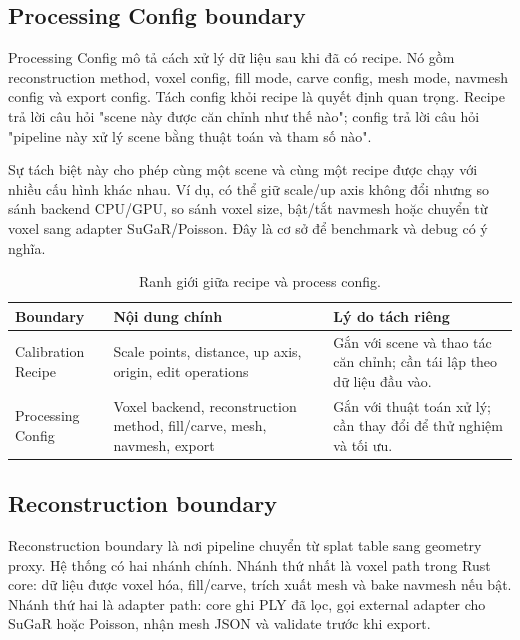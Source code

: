 \subsection{Processing Config boundary}

Processing Config mô tả cách xử lý dữ liệu sau khi đã có recipe. Nó gồm reconstruction method, voxel config, fill mode, carve config, mesh mode, navmesh config và export config. Tách config khỏi recipe là quyết định quan trọng. Recipe trả lời câu hỏi "scene này được căn chỉnh như thế nào"; config trả lời câu hỏi "pipeline này xử lý scene bằng thuật toán và tham số nào".

Sự tách biệt này cho phép cùng một scene và cùng một recipe được chạy với nhiều cấu hình khác nhau. Ví dụ, có thể giữ scale/up axis không đổi nhưng so sánh backend CPU/GPU, so sánh voxel size, bật/tắt navmesh hoặc chuyển từ voxel sang adapter SuGaR/Poisson. Đây là cơ sở để benchmark và debug có ý nghĩa.

\begin{table}[H]
\centering
\caption{Ranh giới giữa recipe và process config.}
\begin{tabularx}{\textwidth}{p{3.4cm}p{5.2cm}X}
\toprule
\textbf{Boundary} & \textbf{Nội dung chính} & \textbf{Lý do tách riêng}\\
\midrule
Calibration Recipe & Scale points, distance, up axis, origin, edit operations & Gắn với scene và thao tác căn chỉnh; cần tái lập theo dữ liệu đầu vào.\\
Processing Config & Voxel backend, reconstruction method, fill/carve, mesh, navmesh, export & Gắn với thuật toán xử lý; cần thay đổi để thử nghiệm và tối ưu.\\
\bottomrule
\end{tabularx}
\end{table}

\subsection{Reconstruction boundary}

Reconstruction boundary là nơi pipeline chuyển từ splat table sang geometry proxy. Hệ thống có hai nhánh chính. Nhánh thứ nhất là voxel path trong Rust core: dữ liệu được voxel hóa, fill/carve, trích xuất mesh và bake navmesh nếu bật. Nhánh thứ hai là adapter path: core ghi PLY đã lọc, gọi external adapter cho SuGaR hoặc Poisson, nhận mesh JSON và validate trước khi export.


